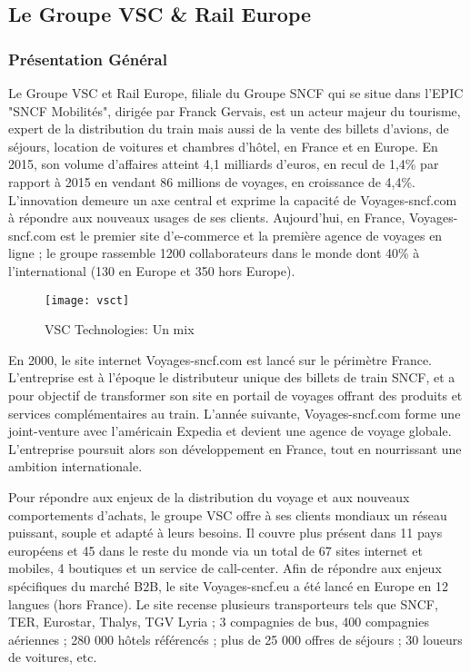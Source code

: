\subsection{Le Groupe VSC \& Rail Europe}
\subsubsection{Présentation Général}

Le Groupe VSC et Rail Europe, filiale du Groupe SNCF qui se situe dans l'EPIC "SNCF Mobilités", dirigée par Franck Gervais, est un acteur majeur du tourisme, expert de la distribution du train mais aussi de la vente des billets d'avions, de séjours, location de voitures et chambres d'hôtel, en France et en Europe. En 2015, son volume d’affaires atteint 4,1 milliards d’euros, en recul de 1,4\% par rapport à 2015 en vendant 86 millions de voyages, en croissance de 4,4\%. L’innovation demeure un axe central et exprime la capacité de Voyages-sncf.com à répondre aux nouveaux usages de ses clients. Aujourd’hui, en France, Voyages-sncf.com est le premier site d’e-commerce et la première agence de voyages en ligne ; le groupe rassemble 1200 collaborateurs dans le monde dont 40\% à l'international (130 en Europe et 350 hors Europe).

\begin{figure}[ht]
 \centering
 \texttt{[image: vsct]}
 \caption{VSC Technologies: Un mix}
 \label{fig:vsct}
\end{figure}

En 2000, le site internet Voyages-sncf.com est lancé sur le périmètre France. L’entreprise est à l’époque le distributeur unique des billets de train SNCF, et a pour objectif de transformer son site en portail de voyages offrant des produits et services complémentaires au train. L’année suivante, Voyages-sncf.com forme une joint-venture avec l’américain Expedia et devient une agence de voyage globale. L’entreprise poursuit alors son développement en France, tout en nourrissant une ambition internationale.

Pour répondre aux enjeux de la distribution du voyage et aux nouveaux comportements d’achats, le groupe VSC offre à ses clients mondiaux un réseau puissant, souple et adapté à leurs besoins. Il couvre plus présent dans 11 pays européens et 45 dans le reste du monde via un total de 67 sites internet et mobiles, 4 boutiques et un service de call-center. Afin de répondre aux enjeux spécifiques du marché B2B, le site Voyages-sncf.eu a été lancé en Europe en 12 langues (hors France).
Le site recense plusieurs transporteurs tels que SNCF, TER, Eurostar, Thalys, TGV Lyria ; 3 compagnies de bus, 400 compagnies aériennes ; 280 000 hôtels référencés ; plus de 25 000 offres de séjours ; 30 loueurs de voitures, etc.

